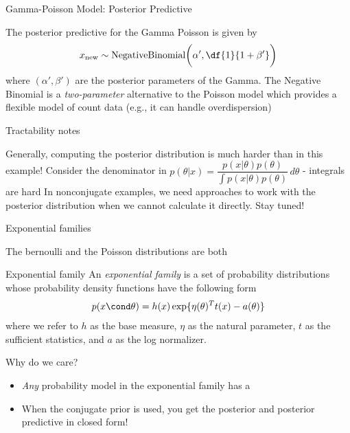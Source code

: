 \documentclass[10pt]{beamer}
\begin{document}
\begin{frame}{Gamma-Poisson Model: Posterior Predictive}

The posterior predictive for the Gamma Poisson is given by 
\[ x_{\text{new}} \sim \text{NegativeBinomial}\bigg(\alpha', \df{1}{1+\beta'} \bigg) \]	
where $(\alpha', \beta')$ are the posterior parameters of the Gamma.
\vfill 
The Negative Binomial is a \textit{two-parameter} alternative to the Poisson model which provides a flexible model of count data {\tiny (e.g., it can handle overdispersion)} 
\end{frame}




\begin{frame}{Tractability notes}

Generally, computing the posterior distribution is much harder than in this example!
\vfill
Consider the denominator in $ p(\theta | x) = \dfrac{p(x | \theta) p(\theta)}{\int p(x | \theta) p(\theta)} \, d\theta $  - integrals are hard 
\vfill
In nonconjugate examples, we need approaches to work with the posterior distribution when we cannot calculate it directly. Stay tuned!

\end{frame}

\begin{frame}{Exponential families}

The bernoulli and the Poisson distributions are both 
 
\begin{block}{Exponential family}
An \textit{exponential family} is a set of probability distributions whose probability density functions have the following form
\begin{align*}
\label{eqn:exponential_family}
 p(x \cond \theta) = h(x) \exp \{ \eta(\theta)^T t(x) - a(\theta)\} 
\end{align*}
where we refer to $h$ as the base measure, $\eta$ as the natural parameter, $t$ as the sufficient statistics, and $a$ as the log normalizer. 
\end{block}

\pause 
\begin{sblock}{Why do we care?}
 \pause 
\begin{itemize}
\item \textit{Any} probability model in the exponential family has a  \pause 
\item When the conjugate prior is used, you get the posterior and posterior predictive in \alert{closed form}! 
\end{itemize}
\end{sblock}

\end{frame}






\end{document}
